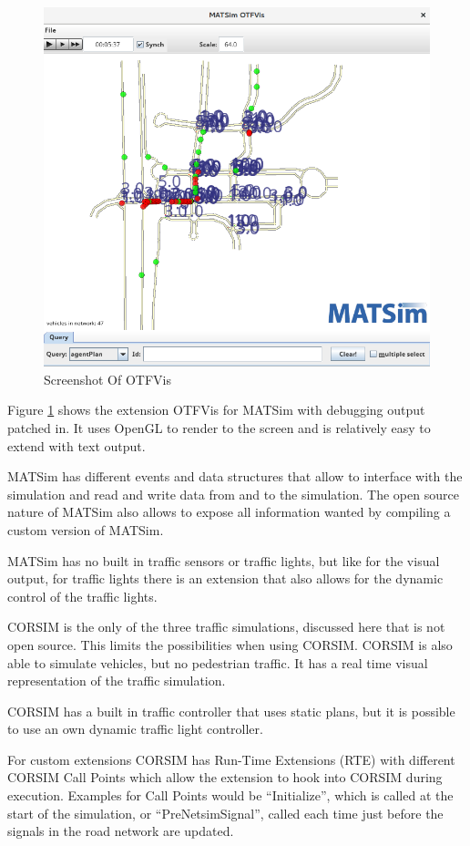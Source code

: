 \begin{figure}[!ht]
  \centering
  \includegraphics[width=12cm]{figures/otfvis}
  \caption{Screenshot Of OTFVis}
  \label{otfvis}
\end{figure}

Figure \ref{otfvis} shows the extension OTFVis for MATSim with debugging output patched in. It uses OpenGL to render to the screen and is relatively easy to extend with text output.

MATSim has different events and data structures that allow to interface with the simulation and read and write data from and to the simulation. The open source nature of MATSim also allows to expose all information wanted by compiling a custom version of MATSim.

MATSim has no built in traffic sensors or traffic lights, but like for the visual output, for traffic lights there is an extension that also allows for the dynamic control of the traffic lights.

CORSIM is the only of the three traffic simulations, discussed here that is not open source.\cite{corSim} This limits the possibilities when using CORSIM. CORSIM is also able to simulate vehicles, but no pedestrian traffic. It has a real time visual representation of the traffic simulation.

CORSIM has a built in traffic controller that uses static plans, but it is possible to use an own dynamic traffic light controller.

For custom extensions CORSIM has Run-Time Extensions (RTE) with different CORSIM Call Points which allow the extension to hook into CORSIM during execution. Examples for Call Points would be ``Initialize'', which is called at the start of the simulation, or ``PreNetsimSignal'', called each time just before the signals in the road network are updated.\cite{corSimRte}

